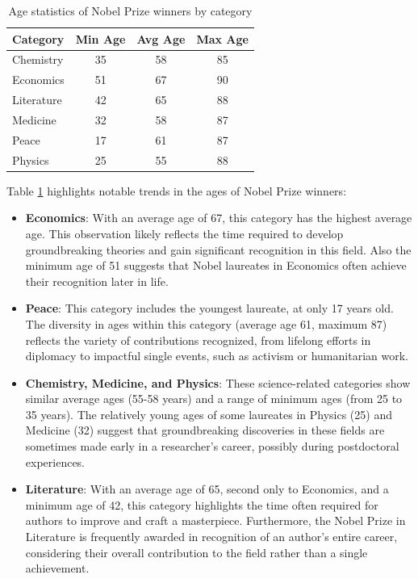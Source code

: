 \documentclass{article}
\begin{document}
\begin{table}[H]
	\centering
	\begin{tabular}{|l|c|c|c|}
		\hline
		\textbf{Category} & \textbf{Min Age} & \textbf{Avg Age} & \textbf{Max Age} \\ \hline
		Chemistry         & 35               & 58               & 85               \\ \hline
		Economics         & 51               & 67               & 90               \\ \hline
		Literature        & 42               & 65               & 88               \\ \hline
		Medicine          & 32               & 58               & 87               \\ \hline
		Peace             & 17               & 61               & 87               \\ \hline
		Physics           & 25               & 55               & 88               \\ \hline
	\end{tabular}
	\caption{Age statistics of Nobel Prize winners by category}
	\label{tab:age_analysis}
\end{table}

Table \ref{tab:age_analysis} highlights notable trends in the ages of Nobel Prize winners:

\begin{itemize}
	\item \textbf{Economics}: With an average age of 67, this category has the highest average age.
	      This observation likely reflects the time required to develop groundbreaking theories and gain significant recognition in this field. Also the minimum age of 51 suggests that Nobel laureates in Economics often
	      achieve their recognition later in life.

	\item \textbf{Peace}: This category includes the youngest laureate, at only 17 years old.
	      The diversity in ages within this category (average age 61, maximum 87) reflects the variety of
	      contributions recognized, from lifelong efforts in diplomacy to impactful single events, such as activism
	      or humanitarian work.

	\item \textbf{Chemistry, Medicine, and Physics}: These science-related categories show similar average ages
	      (55-58 years) and a range of minimum ages (from 25 to 35 years). The relatively young ages of some laureates
	      in Physics (25) and Medicine (32) suggest that groundbreaking discoveries in these fields are sometimes made
	      early in a researcher's career, possibly during postdoctoral experiences.

	\item \textbf{Literature}: With an average age of 65, second only to Economics, and a minimum age of 42, this
	      category highlights the time often required for authors to improve and craft a masterpiece.
	      Furthermore, the Nobel Prize in Literature is frequently awarded in recognition of an author's
	      entire career, considering their overall contribution to the field rather than a single achievement.
\end{itemize}
\end{document}
